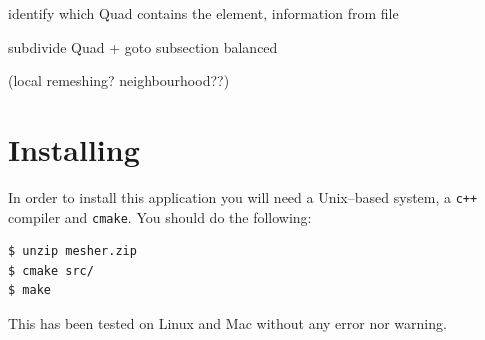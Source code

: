 \documentclass[10pt]{article}
\begin{document}
identify which Quad contains the element, information from file

subdivide Quad + goto subsection balanced

(local remeshing? neighbourhood??)


\section{Installing}
\label{install}

In order to install this application you will need a Unix--based system, a \texttt{c++} compiler and \texttt{cmake}. You should do the following:

{\small
\begin{verbatim}
$ unzip mesher.zip
$ cmake src/
$ make
\end{verbatim}
}

This has been tested on Linux and Mac without any error nor warning.
\end{document}
